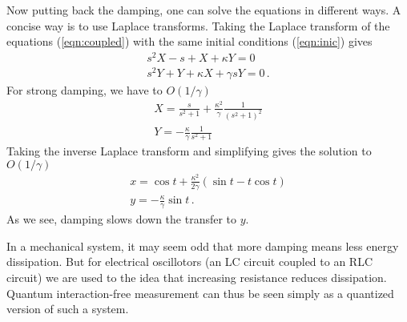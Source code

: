 \documentclass[12pt,aps,prb,preprint]{revtex4}
\begin{document}
Now putting back the damping, one can solve the equations in different
ways.  A concise way is to use Laplace transforms.  Taking the Laplace
transform of the equations (\ref{eqn:coupled}) with the same initial
conditions (\ref{eqn:inic}) gives
\begin{equation}
\begin{array}{l}
s^2 X - s + X + \kappa Y = 0 \\
s^2 Y + Y + \kappa X + \gamma s Y = 0 \,.
\end{array}
\end{equation}
For strong damping, we have to $O(1/\gamma)$
\begin{equation}
\begin{array}{l}
\displaystyle
X = \frac s{s^2+1} + \frac{\kappa^2}\gamma \frac1{(s^2+1)^2} \\
\displaystyle
Y = -\frac\kappa\gamma \frac1{s^2+1}
\end{array}
\end{equation}
Taking the inverse Laplace transform and simplifying gives the
solution to $O(1/\gamma)$
\begin{equation}
\begin{array}{l}
\displaystyle
x = \cos t + \frac{\kappa^2}{2\gamma} (\sin t - t\cos t) \\
\displaystyle
y = -\frac\kappa\gamma \sin t \,.
\end{array}
\end{equation}
As we see, damping slows down the transfer to $y$.

In a mechanical system, it may seem odd that more damping means less
energy dissipation.  But for electrical oscillotors (an LC circuit
coupled to an RLC circuit) we are used to the idea that increasing
resistance reduces dissipation.  Quantum interaction-free measurement
can thus be seen simply as a quantized version of such a system.



\newpage

\def\vmargin{\hrule height 1cm width 0pt}


\def\pgfbeamsplitter(#1,#2)#3{\pgfputat{\pgfxy(#1,#2)}
                              {\pgfbox[center,center]#3
                               \pgfxyline(-1.1,0)(0,1.1)
                               \pgfxyline(0,1.1)(1.1,0)
                               \pgfxyline(1.1,0)(0,-1.1)
                               \pgfxyline(0,-1.1)(-1.1,0)}}

\def\pgfbeamsplitter(#1,#2)#3{\pgfputat{\pgfxy(#1,#2)}
                              {\pgfbox[center,center]#3
                               \pgfxyline(-1.1,0)(0,1.1)
                               \pgfxyline(0,1.1)(1.1,0)
                               \pgfxyline(1.1,0)(0,-1.1)
                               \pgfxyline(0,-1.1)(-1.1,0)}}
\end{document}
